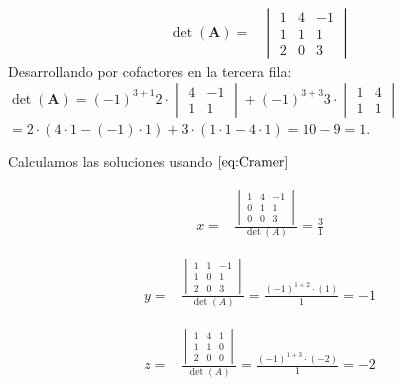\documentclass[
]{article}
\begin{document}
\begin{equation*}
\begin{array}{ccc}
\det(\mathbf{A})     = &  \begin{vmatrix} 
                        1     & 4        & -1      \\ 
                        1     & 1        &  1       \\
                        2     & 0        & 3
  \end{vmatrix} 
\end{array}
\end{equation*} Desarrollando por cofactores en la tercera fila:
\(\det(\mathbf{A})=(-1)^{3+1}2\cdot \begin{vmatrix} 4 & -1 \\ 1 & 1 \end{vmatrix} + (-1)^{3+3}3\cdot \begin{vmatrix} 1 & 4 \\ 1 & 1 \end{vmatrix}\)
\(=2\cdot(4\cdot 1 - (-1)\cdot 1) + 3\cdot (1\cdot 1 - 4\cdot 1)=10 - 9=1\).

Calculamos las soluciones usando \(\eqref{eq:Cramer}\)

\begin{equation*}
    \begin{array}{cc}
      x=& \frac{\begin{vmatrix} 1 & 4 & -1 \\ 0 & 1 & 1 \\ 0 & 0 & 3  \end{vmatrix}}{\det(A)} = \frac{3}{1} 
    \end{array}
  \end{equation*}

\begin{equation*}  
    \begin{array}{cc}
      y=& \frac{\begin{vmatrix} 1 & 1 & -1 \\ 1 & 0 & 1 \\ 2 & 0 & 3  \end{vmatrix}}{\det(A)} = \frac{(-1)^{1+2}\cdot (1)}{1}=-1 
    \end{array}
  \end{equation*}

\begin{equation*}
    \begin{array}{cc}
      z=& \frac{\begin{vmatrix} 1 & 4 & 1 \\ 1 & 1 & 0 \\ 2 & 0 & 0  \end{vmatrix}}{\det(A)} = \frac{(-1)^{1+3}\cdot(-2)}{1} = -2
    \end{array}
  \end{equation*}
\end{document}
